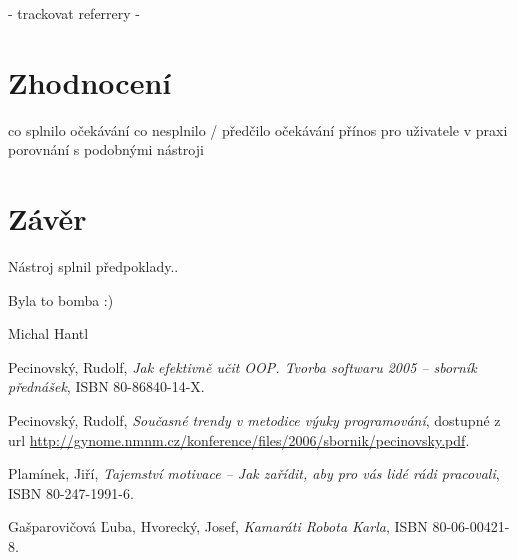 \documentclass[bc,female,java,dept456]{diploma}						%
\begin{document}
 - trackovat referrery
 - 



\section{Zhodnocení}
co splnilo očekávání
co nesplnilo / předčilo očekávání
přínos pro uživatele v praxi
porovnání s podobnými nástroji




\section{Závěr}
\label{sec:Conclusion}

Nástroj splnil předpoklady..

Byla to bomba :)

\bigskip
\begin{flushright}
Michal Hantl
\end{flushright}









\begin{thebibliography}{99}


 Pecinovský, Rudolf,
\textit{Jak efektivně učit OOP. Tvorba softwaru 2005 – sborník přednášek}, ISBN 80-86840-14-X.

 Pecinovský, Rudolf,
\textit{Současné trendy v metodice výuky programování}, dostupné z url \url{http://gynome.nmnm.cz/konference/files/2006/sbornik/pecinovsky.pdf}.

 Plamínek, Jiří,
\textit{Tajemství motivace – Jak zařídit, aby pro vás lidé rádi pracovali}, ISBN 80-247-1991-6.

 Gašparovičová Ľuba, Hvorecký, Josef,
\textit{Kamaráti Robota Karla}, ISBN 80-06-00421-8.

\end{thebibliography}


\end{document}
